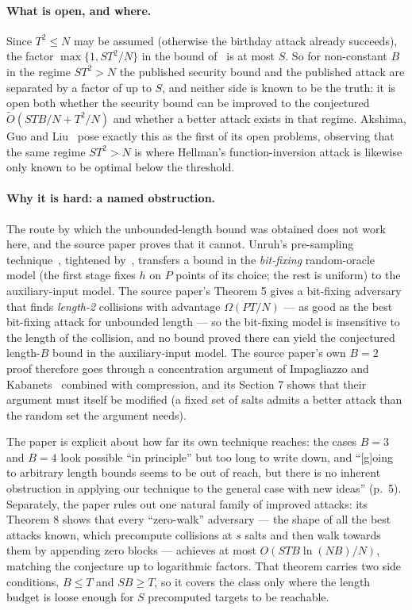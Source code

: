 \documentclass{aicr-conjecture}
\newcommand{\tO}{\tilde{O}}
\begin{document}
\paragraph{What is open, and where.}
Since $T^{2} \le N$ may be assumed (otherwise the birthday attack
already succeeds), the factor $\max\{1, ST^{2}/N\}$ in the bound
of~\cite{AGL22} is at most $S$. So for non-constant $B$ in the regime
$ST^{2} > N$ the published security bound and the published attack are
separated by a factor of up to $S$, and neither side is known to be the
truth: it is open both whether the security bound can be improved to
the conjectured $\tO(STB/N + T^{2}/N)$ and whether a better attack
exists in that regime. Akshima, Guo and Liu~\cite{AGL22} pose exactly this as the first of
its open problems, observing that the same regime $ST^{2} > N$ is
where Hellman's function-inversion attack is likewise only known to be
optimal below the threshold.

\paragraph{Why it is hard: a named obstruction.}
The route by which the unbounded-length bound was obtained does not
work here, and the source paper proves that it cannot. Unruh's
pre-sampling technique~\cite{Unr07}, tightened by~\cite{CDGS18},
transfers a bound in the \emph{bit-fixing} random-oracle model (the
first stage fixes $h$ on $P$ points of its choice; the rest is
uniform) to the auxiliary-input model. The source paper's Theorem 5
gives a bit-fixing adversary that finds \emph{length-2} collisions with
advantage $\Omega(PT/N)$ --- as good as the best bit-fixing attack for
unbounded length --- so the bit-fixing model is insensitive to the
length of the collision, and no bound proved there can yield the
conjectured length-$B$ bound in the auxiliary-input model. The source
paper's own $B = 2$ proof therefore goes through a concentration
argument of Impagliazzo and Kabanets~\cite{IK10} combined with
compression, and its Section 7 shows that their
argument must itself be modified (a fixed set of salts admits a better
attack than the random set the argument needs).

The paper is explicit about how far its own technique reaches: the
cases $B = 3$ and $B = 4$ look possible ``in principle'' but too long
to write down, and ``[g]oing to arbitrary length bounds seems to be out
of reach, but there is no inherent obstruction in applying our
technique to the general case with new ideas'' (p.~5). Separately, the
paper rules out one natural family of improved attacks: its Theorem 8
shows that every ``zero-walk'' adversary --- the shape of all the
best attacks known, which precompute collisions at $s$ salts and then
walk towards them by appending zero blocks --- achieves at most
$O(STB\ln(NB)/N)$, matching the conjecture up to logarithmic factors.
That theorem carries two side conditions, $B \le T$ and $SB \ge T$, so
it covers the class only where the length budget is loose enough for
$S$ precomputed targets to be reachable.
\end{document}
